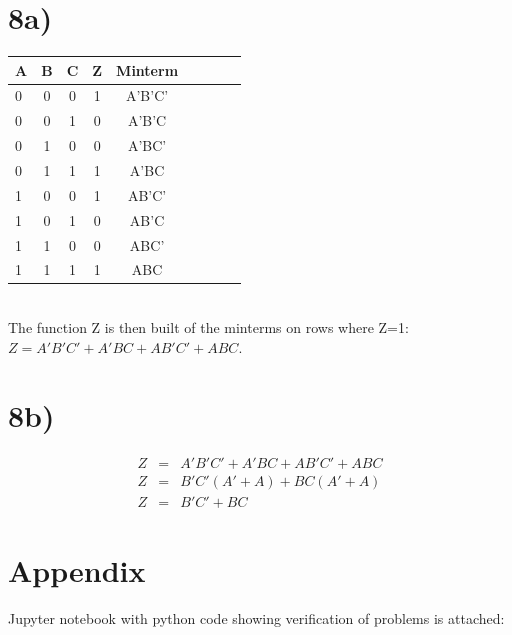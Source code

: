 \documentclass[a4paper,11pt]{article}
\begin{document}
\section*{8a)}
\begin{tabular}{| l | c | c | c | c | c | c | c | c |}
  \hline	
    A & B & C & Z & Minterm \\  \hline \hline
    0 & 0 & 0 & 1 & A'B'C'  \\  \hline
    0 & 0 & 1 & 0 & A'B'C  \\  \hline
    0 & 1 & 0 & 0 & A'BC'  \\  \hline
    0 & 1 & 1 & 1 & A'BC  \\  \hline
    1 & 0 & 0 & 1 & AB'C'  \\  \hline
    1 & 0 & 1 & 0 & AB'C  \\  \hline
    1 & 1 & 0 & 0 & ABC'  \\  \hline
    1 & 1 & 1 & 1 & ABC  \\  \hline
\end{tabular} \\

The function Z is then built of the minterms on rows where Z=1:  $Z = A'B'C' + A'BC + AB'C' + ABC$.

\section*{8b)}
\begin{eqnarray}
Z &=& A'B'C' + A'BC + AB'C' + ABC \\
Z &=& B'C'(A' + A) + BC(A' + A) \\
Z &=& B'C' + BC 
\end{eqnarray}



\section*{Appendix}
Jupyter notebook with python code showing verification of problems is attached:
\end{document}

